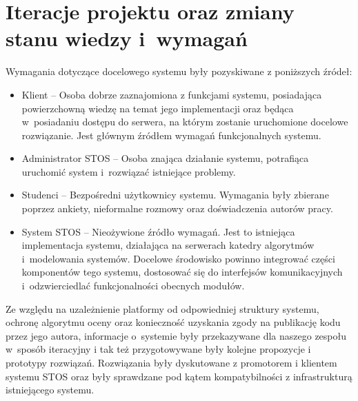 \section{Iteracje projektu oraz zmiany stanu wiedzy i~wymagań}
Wymagania dotyczące docelowego systemu były pozyskiwane z poniższych źródeł:
\begin{itemize}
    \item Klient -- Osoba dobrze zaznajomiona z funkcjami systemu, posiadająca powierzchowną wiedzę na temat jego implementacji oraz będąca w~posiadaniu dostępu do serwera, na którym zostanie uruchomione docelowe rozwiązanie. Jest głównym źródłem wymagań funkcjonalnych systemu.
    \item Administrator STOS -- Osoba znająca działanie systemu, potrafiąca uruchomić system i~rozwiązać istniejące problemy.
    \item Studenci -- Bezpośredni użytkownicy systemu. Wymagania były zbierane poprzez ankiety, nieformalne rozmowy oraz doświadczenia autorów pracy.
    \item System STOS -- Nieożywione źródło wymagań. Jest to istniejąca implementacja systemu, działająca na serwerach katedry algorytmów i~modelowania systemów. Docelowe środowisko powinno integrować części komponentów tego systemu, dostosować się do interfejsów komunikacyjnych i~odzwierciedlać funkcjonalności obecnych modułów.
\end{itemize}
Ze względu na uzależnienie platformy od odpowiedniej struktury systemu, ochronę algorytmu oceny oraz konieczność uzyskania zgody na publikację kodu przez jego autora, informacje o~systemie były przekazywane dla naszego zespołu w~sposób iteracyjny i tak też przygotowywane były kolejne propozycje i prototypy rozwiązań. Rozwiązania były dyskutowane z promotorem i klientem systemu STOS oraz były sprawdzane pod kątem kompatybilności z infrastrukturą istniejącego systemu.

